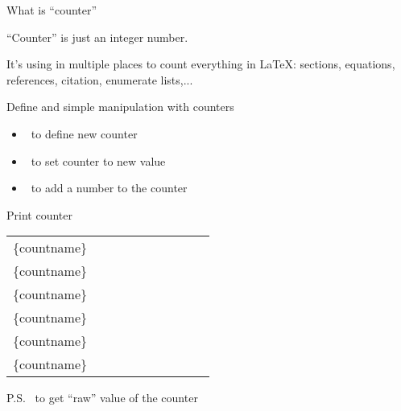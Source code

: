 \graphicspath{{sec/images/}{sec/code/counters/}}
\lstset{inputpath=sec/code/counters}

\begin{frame}{What is ``counter''}\relax

    ``Counter'' is just an integer number.
    
    It's using in multiple places to count everything in \LaTeX: sections, equations, references, citation, enumerate lists,...
     
\end{frame}

\begin{frame}{Define and simple manipulation with counters \lW}\relax
    
    \begin{itemize}
        \item \ccol\newcounter\ to define new counter 
        \item \ccol\setcounter\ to set counter to new value
        \item \ccol\addtocounter\ to add a number to the counter
    \end{itemize}
    
     
\end{frame}

\begin{frame}[fragile]{Print counter\lW}\relax
     
     \newcommand{\countab}[1]{
     \ccol#1\{countname\}&
     \setcounter{tmptt}{1} #1{tmptt} &
     \setcounter{tmptt}{2} #1{tmptt} &
     \setcounter{tmptt}{3} #1{tmptt} &
     \setcounter{tmptt}{4} #1{tmptt} &
     \setcounter{tmptt}{5} #1{tmptt} &
     \setcounter{tmptt}{6} #1{tmptt} &
     \setcounter{tmptt}{7} #1{tmptt} &
     \setcounter{tmptt}{8} #1{tmptt} &
     \setcounter{tmptt}{9} #1{tmptt}
     \\}
     
     \begin{tabular}{l|ccccccccc}
          \countab{\arabic}
          \countab{\alph}
          \countab{\Alph}
          \countab{\roman}
          \countab{\Roman}
          \countab{\fnsymbol}
     \end{tabular}
     \vspace{1ex}
     
     P.S. \ccol\value\ to get ``raw'' value of the counter
\end{frame}

